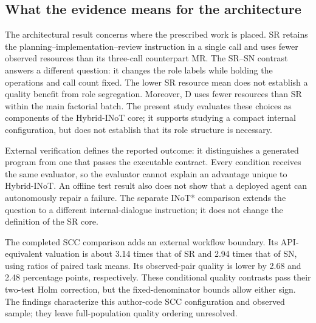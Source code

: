 \subsection{What the evidence means for the architecture}
The architectural result concerns where the prescribed work is placed. SR retains the planning--implementation--review instruction in a single call and uses fewer observed resources than its three-call counterpart MR. The SR--SN contrast answers a different question: it changes the role labels while holding the operations and call count fixed. The lower SR resource mean does not establish a quality benefit from role segregation. Moreover, D uses fewer resources than SR within the main factorial batch. The present study evaluates these choices as components of the Hybrid-INoT core; it supports studying a compact internal configuration, but does not establish that its role structure is necessary.

External verification defines the reported outcome: it distinguishes a generated program from one that passes the executable contract. Every condition receives the same evaluator, so the evaluator cannot explain an advantage unique to Hybrid-INoT. An offline test result also does not show that a deployed agent can autonomously repair a failure. The separate INoT* comparison extends the question to a different internal-dialogue instruction; it does not change the definition of the SR core.

The completed SCC comparison adds an external workflow boundary. Its API-equivalent valuation is about 3.14 times that of SR and 2.94 times that of SN, using ratios of paired task means. Its observed-pair quality is lower by 2.68 and 2.48 percentage points, respectively. These conditional quality contrasts pass their two-test Holm correction, but the fixed-denominator bounds allow either sign. The findings characterize this author-code SCC configuration and observed sample; they leave full-population quality ordering unresolved.

